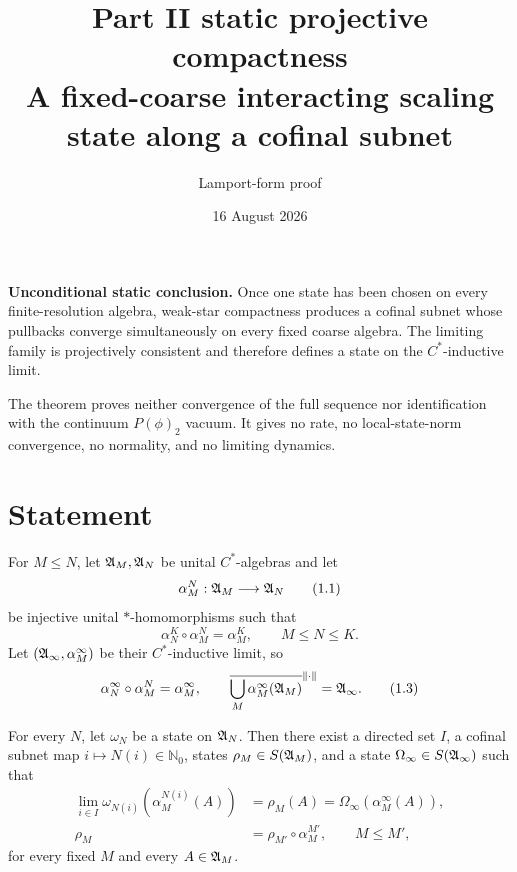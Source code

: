 \documentclass[11pt,a4paper]{article}
\title{Part II static projective compactness\\[3pt]
\large A fixed-coarse interacting scaling state along a cofinal subnet}
\author{Lamport-form proof}
\date{16 August 2026}
\begin{document}
\maketitle

\begin{resultbox}
\textbf{Unconditional static conclusion.}  Once one state has been chosen on every
finite-resolution algebra, weak-star compactness produces a cofinal subnet whose
pullbacks converge simultaneously on every fixed coarse algebra.  The limiting family
is projectively consistent and therefore defines a state on the \(C^*\)-inductive limit.

The theorem proves neither convergence of the full sequence nor identification with the
continuum \(P(\phi)_2\) vacuum.  It gives no rate, no local-state-norm convergence, no
normality, and no limiting dynamics.
\end{resultbox}

\tableofcontents

\section{Statement}

\begin{definition}
For \(M\le N\), let \(\mathfrak A_M,\mathfrak A_N\) be unital \(C^*\)-algebras and let
\[
 \alpha_M^N:\mathfrak A_M\longrightarrow\mathfrak A_N                              \tag{1.1}
\]
be injective unital \( * \)-homomorphisms such that
\[
 \alpha_N^K\circ\alpha_M^N=\alpha_M^K,\qquad M\le N\le K.        \tag{1.2}
\]
Let \((\mathfrak A_\infty,\alpha_M^\infty)\) be their \(C^*\)-inductive limit, so
\[
 \alpha_N^\infty\circ\alpha_M^N=\alpha_M^\infty,\qquad
 \overline{\bigcup_M\alpha_M^\infty(\mathfrak A_M)}^{\|\cdot\|}
 =\mathfrak A_\infty.                                                    \tag{1.3}
\]
\end{definition}

\begin{theorem}\label{thm:compactness}
For every \(N\), let \(\omega_N\) be a state on \(\mathfrak A_N\).  Then there exist a
directed set \(I\), a cofinal subnet map \(i\mapsto N(i)\in\mathbb N_0\), states
\(\rho_M\in S(\mathfrak A_M)\), and a state \(\Omega_\infty\in S(\mathfrak A_\infty)\) such that
\begin{align}
 \lim_{i\in I}\omega_{N(i)}(\alpha_M^{N(i)}(A))
 &=\rho_M(A)
 =\Omega_\infty(\alpha_M^\infty(A)),                            \tag{1.4}\\
 \rho_M&=\rho_{M'}\circ\alpha_M^{M'},\qquad M\le M',             \tag{1.5}
\end{align}
for every fixed \(M\) and every \(A\in\mathfrak A_M\).
\end{theorem}
\end{document}
